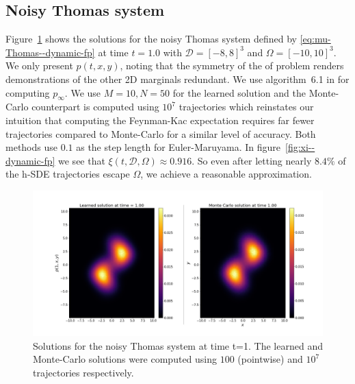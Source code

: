 \subsection{Noisy Thomas system}
Figure~\ref{fig:Thomas-time--dynamic-fp} shows the solutions for the noisy Thomas system defined by \eqref{eq:mu-Thomas--dynamic-fp} at time $t=1.0$ with $\mathcal D=[-8, 8]^3$ and $\Omega=[-10, 10]^3$. We only present $p(t, x, y)$, noting that the symmetry of the of problem renders demonstrations of the other 2D marginals redundant. We use algorithm~6.1 in \cite{mandal2023learning} for computing $p_\infty$. We use $M=10, N=50$ for the learned solution and the Monte-Carlo counterpart is computed using $10^7$ trajectories which reinstates our intuition that computing the Feynman-Kac expectation requires far fewer trajectories compared to Monte-Carlo for a similar level of accuracy.  Both methods use $0.1$ as the step length for Euler-Maruyama. In figure~\ref{fig:xi--dynamic-fp} we see that $\xi(t, \mathcal D, \Omega)\approx0.916$. So even after letting nearly $8.4\%$ of the h-SDE trajectories escape $\Omega$, we achieve a reasonable approximation.
\begin{figure}[!ht]
    \centering
\includegraphics[scale=0.32]{dynamic-fp/plots/dynamic-plots-Thomas-time.png}
    \caption{Solutions for the noisy Thomas system at time t=1. The learned and Monte-Carlo solutions were computed using $100$ (pointwise) and $10^7$ trajectories respectively.}
    \label{fig:Thomas-time--dynamic-fp}
\end{figure}

